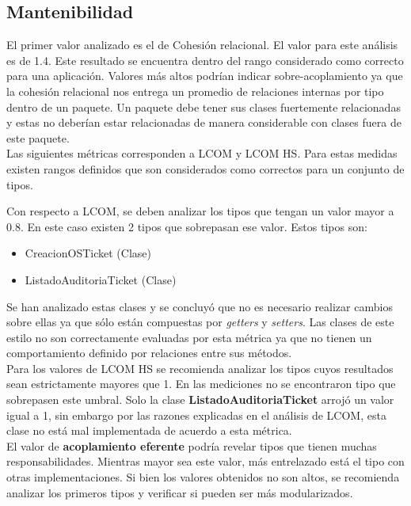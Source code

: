 \subsection{Mantenibilidad}

El primer valor analizado es el de Cohesión relacional. El valor para este análisis es de 1.4. Este resultado se
encuentra dentro del rango considerado como correcto para una aplicación. Valores
más altos podrían indicar sobre-acoplamiento ya que la cohesión relacional nos entrega un promedio de relaciones internas por tipo dentro de un
paquete. Un paquete debe tener sus clases fuertemente relacionadas y estas no deberían estar relacionadas de manera
considerable con clases fuera de este paquete.
\\

Las siguientes métricas corresponden a LCOM y LCOM HS. Para estas medidas existen rangos definidos que son considerados como correctos para un conjunto de tipos.

Con respecto a LCOM, se deben analizar los tipos que tengan un valor mayor a 0.8. En este caso existen 2 tipos que sobrepasan ese valor. Estos tipos son:
\begin{itemize}
\item CreacionOSTicket (Clase)
\item ListadoAuditoriaTicket (Clase)	
\end{itemize}

Se han analizado estas clases y se concluyó que no es necesario realizar 
cambios sobre ellas ya que sólo están compuestas por \textit{getters} 
y \textit{setters}. Las clases de este estilo no son correctamente evaluadas 
por esta métrica ya que no tienen un comportamiento definido por relaciones 
entre sus métodos.
\\

Para los valores de LCOM HS se recomienda analizar los tipos cuyos resultados 
sean estrictamente mayores que 1. En las mediciones no se encontraron tipo 
que sobrepasen este umbral. Solo la clase \textbf{ListadoAuditoriaTicket} 
arrojó un valor igual a 1, sin embargo por las razones explicadas en el análisis 
de LCOM, esta clase no está mal implementada de acuerdo a esta métrica.
\\

El valor de \textbf{acoplamiento eferente} podría revelar tipos que tienen 
muchas responsabilidades. Mientras mayor sea este valor, más entrelazado está 
el tipo con otras implementaciones. Si bien los valores obtenidos no son altos, 
se recomienda analizar los primeros tipos y verificar si pueden ser más modularizados.
\\

